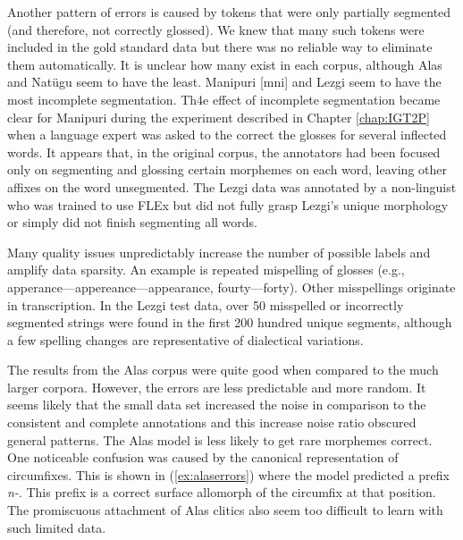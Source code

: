 Another pattern of errors is caused by tokens that were only partially segmented (and therefore, not correctly glossed). We knew that many such tokens were included in the gold standard data but there was no reliable way to eliminate them automatically. It is unclear how many exist in each corpus, although Alas and Nat\"ugu seem to have the least. Manipuri [mni] and Lezgi seem to have the most incomplete segmentation. Th4e effect of incomplete segmentation became clear for Manipuri during the experiment described in Chapter \ref{chap:IGT2P} when a language expert was asked to the correct the glosses for several inflected words. It appears that, in the original corpus, the annotators had been focused only on segmenting and glossing certain morphemes on each word, leaving other affixes on the word unsegmented. 
The Lezgi data was annotated by a non-linguist who was trained to use FLEx but did not fully grasp Lezgi's unique morphology or simply did not finish segmenting all words. 

Many quality issues unpredictably increase the number of possible labels and amplify data sparsity. An example is
repeated mispelling of glosses (e.g., apperance---appereance---appearance, fourty---forty). Other misspellings originate in transcription. In the Lezgi test data, over 50 misspelled or incorrectly segmented strings were found in the first 200 hundred unique segments, although a few spelling changes are representative of dialectical variations.  


The results from the Alas corpus were quite good when compared to the much larger corpora. However, the errors are less predictable and more random. It seems likely that the small data set increased the noise in comparison to the consistent and complete annotations and this increase noise ratio obscured general patterns. 
The Alas model is less likely to get rare morphemes correct. 
One noticeable confusion was caused by the canonical representation of circumfixes. This is shown in (\ref{ex:alaserrors}) where the model predicted a prefix \textit{n-}. This prefix is a correct surface allomorph of the circumfix at that position. 
The promiscuous attachment of Alas clitics also seem too difficult to learn with such limited data.

